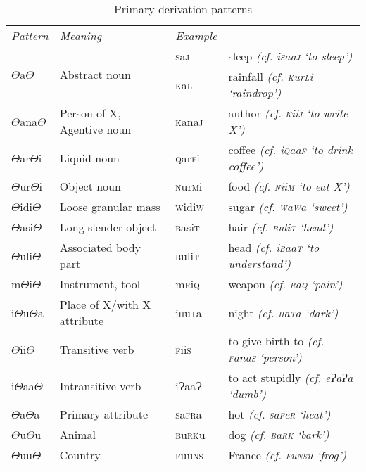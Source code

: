 \documentclass[a4paper,10pt,twoside,openright,draft]{memoir}
\newcommand{\rootpart}{$\Theta$}
\newcommand{\bigglot}{Ɂ}
\begin{document}
\begin{table}[ht]
    \centering
    \begin{tabular}{llll}
    \textit{Pattern} & \textit{Meaning} & \textit{Example} & \\
    \multirow{2}{*}{{\rootpart}a{\rootpart}} & \multirow{2}{*}{Abstract noun}& \textsc{s}a\textsc{j} & sleep \emph{(cf. i\textsc{s}aa\textsc{j} `to sleep')}\\
    & & \textsc{k}a\textsc{l} & rainfall \emph{(cf. \textsc{k}ur\textsc{l}i `raindrop')}\\
    {\rootpart}ana{\rootpart} & Person of X, Agentive noun & \textsc{k}ana\textsc{j} & author \emph{(cf. \textsc{k}ii\textsc{j} `to write X')}\\
    {\rootpart}ar{\rootpart}i & Liquid noun & \textsc{q}ar\textsc{f}i & coffee \emph{(cf. i\textsc{q}aa\textsc{f} `to drink coffee')} \\
    {\rootpart}ur{\rootpart}i & Object noun & \textsc{n}ur\textsc{m}i & food \emph{(cf. \textsc{n}ii\textsc{m} `to eat X')}\\
    {\rootpart}idi{\rootpart} & Loose granular mass & \textsc{w}idi\textsc{w} & sugar \emph{(cf. \textsc{w}a\textsc{w}a `sweet')} \\
    {\rootpart}asi{\rootpart} & Long slender object & \textsc{b}asi\textsc{t} & hair \emph{(cf. \textsc{b}uli\textsc{t} `head')} \\
    {\rootpart}uli{\rootpart} & Associated body part & \textsc{b}uli\textsc{t} & head \emph{(cf. i\textsc{b}aa\textsc{t} `to understand')}\\
    m{\rootpart}i{\rootpart} & Instrument, tool & m\textsc{r}i\textsc{q} & weapon \emph{(cf. \textsc{r}a\textsc{q} `pain')} \\
    i{\rootpart}u{\rootpart}a & Place of X/with X attribute & i\textsc{h}u\textsc{t}a & night \emph{(cf. \textsc{h}a\textsc{t}a `dark')} \\
    {\rootpart}ii{\rootpart} & Transitive verb & \textsc{f}ii\textsc{s} & to give birth to \emph{(cf. \textsc{f}ana\textsc{s} `person')} \\
    i{\rootpart}aa{\rootpart} & Intransitive verb & i\bigglot aa\bigglot & to act stupidly \emph{(cf. e\bigglot a\bigglot a `dumb')} \\
    {\rootpart}a{\rootpart}a & Primary attribute & \textsc{s}a\textsc{fr}a & hot \emph{(cf. \textsc{s}a\textsc{f}e\textsc{r} `heat')} \\
    {\rootpart}u{\rootpart}u & Animal & \textsc{b}u\textsc{rk}u & dog \emph{(cf. \textsc{b}a\textsc{rk} `bark')} \\
    {\rootpart}uu{\rootpart} & Country & \textsc{f}uu\textsc{ns} & France \emph{(cf. \textsc{f}u\textsc{ns}u `frog')}
    
    \end{tabular}
    \caption{Primary derivation patterns}
    \label{tab:primedevs}
\end{table}
\end{document}
